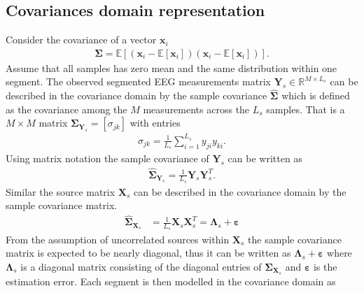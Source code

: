 \subsection{Covariances domain representation}
Consider the covariance of a vector $\textbf{x}_i$  
\begin{align*}
\boldsymbol{\Sigma}=\mathbb{E}[(\textbf{x}_i-\mathbb{E}[\textbf{x}_i])(\textbf{x}_i-\mathbb{E}[\textbf{x}_i])].
\end{align*} 
Assume that all samples has zero mean and the same distribution within one segment. The observed segmented EEG measurements matrix $\mathbf{Y}_s \in \mathbb{R}^{M \times L_s}$ can be described in the covariance domain by the sample covariance $\widehat{\boldsymbol{\Sigma}}$ which is defined as the covariance among the $M$ measurements across the $L_s$ samples. That is a $M \times M$ matrix $\boldsymbol{\Sigma}_{\mathbf{Y}_s}=[\sigma_{jk}]$ with entries 
\begin{align*}
\sigma_{jk}= \frac{1}{L_s}\sum_{i=1}^{L_s} y_{ji} y_{ki}.
\end{align*}
Using matrix notation the sample covariance of $\mathbf{Y}_s$ can be written as
\begin{align*}
\widehat{\boldsymbol{\Sigma}}_{\mathbf{Y}_s} = \frac{1}{L_s} \mathbf{Y}_s \mathbf{Y}_s^T.
\end{align*}  
Similar the source matrix $\mathbf{X}_s$ can be described in the covariance domain by the sample covariance matrix.
\begin{align*}
\widehat{\boldsymbol{\Sigma}}_{\mathbf{X}_s} &= \frac{1}{L_s} \mathbf{X}_s \mathbf{X}_s^T = \boldsymbol{\Lambda}_s + \boldsymbol{\varepsilon} 
\end{align*}
From the assumption of uncorrelated sources within $\mathbf{X}_s$ the sample covariance matrix is expected to be nearly diagonal, thus it can be written as $\boldsymbol{\Lambda}_s + \boldsymbol{\varepsilon}$ where $\boldsymbol{\Lambda}_s$ is a diagonal matrix consisting of the diagonal entries of $\widehat{\boldsymbol{\Sigma}}_{\mathbf{X}_s}$ and $ \boldsymbol{\varepsilon}$ is the estimation error\cite{Balkan2015}.
Each segment is then modelled in the covariance domain as

